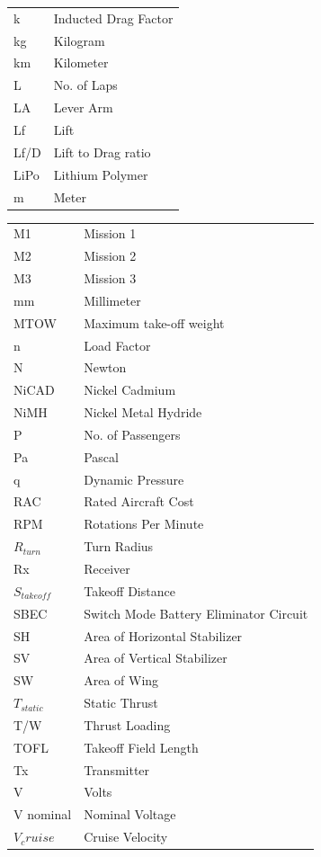 \documentclass[10pt, letterpaper]{article}
\begin{document}
{\begin{minipage}{0.48\textwidth}
\begin{tabular}{ll}
k & Inducted Drag Factor \\
kg & Kilogram \\
km & Kilometer \\
L & No. of Laps \\
LA & Lever Arm \\
Lf & Lift \\
Lf/D & Lift to Drag ratio \\
LiPo & Lithium Polymer \\
m & Meter \\
\end{tabular}
\end{minipage}
\hfill
\begin{minipage}{0.48\textwidth}
\centering
\begin{tabular}{ll}
M1 & Mission 1 \\
M2 & Mission 2 \\
M3 & Mission 3 \\
mm & Millimeter \\
MTOW & Maximum take-off weight \\
n & Load Factor \\
N & Newton \\
NiCAD & Nickel Cadmium \\
NiMH & Nickel Metal Hydride \\
P & No. of Passengers \\
Pa & Pascal \\
q & Dynamic Pressure \\
RAC & Rated Aircraft Cost \\
RPM & Rotations Per Minute \\
$R_{turn}$ & Turn Radius \\
Rx & Receiver \\
$S_{takeoff}$ & Takeoff Distance \\
SBEC & Switch Mode Battery Eliminator Circuit \\
SH & Area of Horizontal Stabilizer \\
SV & Area of Vertical Stabilizer \\
SW & Area of Wing \\
$T_{static}$ & Static Thrust \\
T/W & Thrust Loading \\
TOFL & Takeoff Field Length \\
Tx & Transmitter \\
V & Volts \\
V nominal & Nominal Voltage \\
$V_cruise$ & Cruise Velocity \\

\end{tabular}
\end{minipage}}
\end{document}
